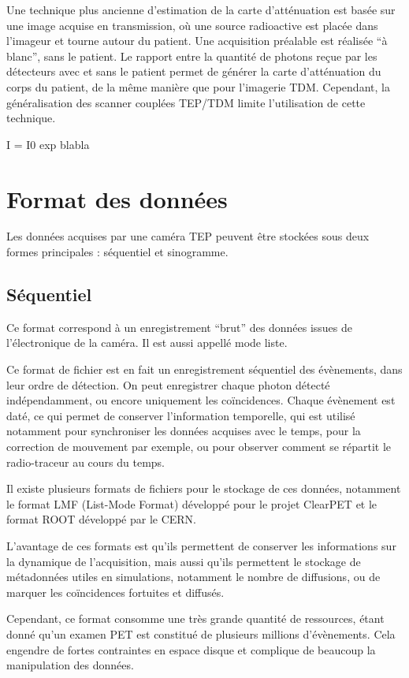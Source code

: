 Une technique plus ancienne d'estimation de la carte d'atténuation est basée sur une image acquise en transmission, où une source radioactive est placée dans l'imageur et tourne autour du patient. Une acquisition  préalable est réalisée ``à blanc'', sans le patient. Le rapport entre la quantité de photons reçue par les détecteurs avec et sans le patient permet de générer la carte d'atténuation du corps du patient, de la même manière que pour l'imagerie TDM. Cependant, la généralisation des scanner couplées TEP/TDM limite l'utilisation de cette technique.

I = I0 exp blabla



	\section{Format des données}
Les données acquises par une caméra TEP peuvent être stockées sous deux formes principales : séquentiel et sinogramme.

		\subsection{Séquentiel}
\label{lab:modeliste}
Ce format correspond à un enregistrement ``brut'' des données issues de l'électronique de la caméra. Il est aussi appellé mode liste.

Ce format de fichier est en fait un enregistrement séquentiel des évènements, dans leur ordre de détection. On peut enregistrer chaque photon détecté indépendamment, ou encore uniquement les coïncidences. Chaque évènement est daté, ce qui permet de conserver l’information temporelle, qui est utilisé notamment pour synchroniser les données acquises avec le temps, pour la correction de mouvement par exemple, ou pour observer comment se répartit le radio-traceur au cours du temps.

Il existe plusieurs formats de fichiers pour le stockage de ces données, notamment le format LMF (List-Mode Format) développé pour le projet ClearPET et le format ROOT développé par le CERN. 

L'avantage de ces formats est qu'ils permettent de conserver les informations sur la dynamique de l'acquisition, mais aussi qu'ils permettent le stockage de métadonnées utiles en simulations, notamment le nombre de diffusions, ou de marquer les coïncidences fortuites et diffusés.

Cependant, ce format consomme une très grande quantité de ressources, étant donné qu'un examen PET est constitué de plusieurs millions d'évènements. Cela engendre de fortes contraintes en espace disque et complique de beaucoup la manipulation des données. 

